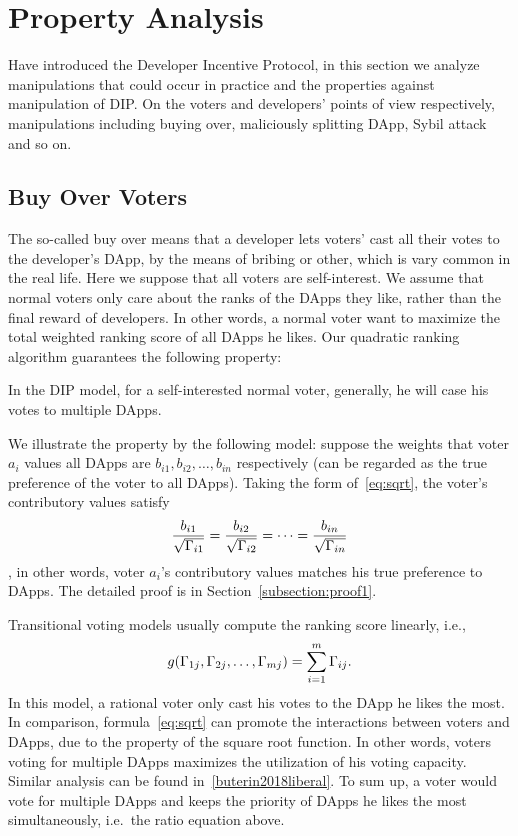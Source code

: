 \section{Property Analysis}
\label{section:properties}
Have introduced the Developer Incentive Protocol, in this section we analyze
manipulations that could occur in practice and the properties against
manipulation of  DIP\@. On the voters and developers' points of view respectively, manipulations including buying over, maliciously splitting DApp, Sybil attack and so on.
\subsection{Buy Over Voters}
The so-called buy over means that a developer lets voters' cast all their votes to the developer's DApp, by the means of bribing or other, which is vary common in the real life. Here we suppose that all voters are self-interest. We assume that normal voters only care about the ranks of the DApps they like, rather than the final reward of developers. In other words, a normal voter want to maximize the total
weighted ranking score of all DApps he likes. Our quadratic ranking algorithm guarantees the following property:
\begin{property}
	\label{p1}
	In the DIP model, for a self-interested normal voter, generally, he will case his votes to multiple DApps.
\end{property}
We illustrate the property by the following model: suppose the weights that
voter $a_i$ values all DApps are $b_{i1}, b_{i2}, \ldots, b_{in}$ respectively (can be regarded as the true preference of the voter to all DApps). Taking the form of~\ref{eq:sqrt}, the voter's contributory values satisfy
$$\frac{b_{i1}}{\sqrt{\Gamma_{i1}}}=\frac{b_{i2}}{\sqrt{\Gamma_{i2}}}=\cdots=\frac{b_{in}}{\sqrt{\Gamma_{in}}}$$,
in other words, voter $a_i$'s contributory values matches his true preference to DApps. The detailed proof is in Section~\ref{subsection:proof1}.

Transitional voting models usually compute the ranking score linearly, i.e.,
$$g(\Gamma_{1j},\Gamma_{2j},\ldots,\Gamma_{mj}) = \sum_{i=1}^m \Gamma_{ij}.$$
In this model, a rational voter only cast his votes to the DApp he likes the
most. In comparison, formula~\ref{eq:sqrt} can promote the interactions between
voters and DApps, due to the property of the square root function. In other
words, voters voting for multiple DApps maximizes the utilization of his voting
capacity. Similar analysis can be found in~\ref{buterin2018liberal}. To sum up,
a voter would vote for multiple DApps and keeps the priority of DApps he likes
the most simultaneously, i.e.\ the ratio equation above.

